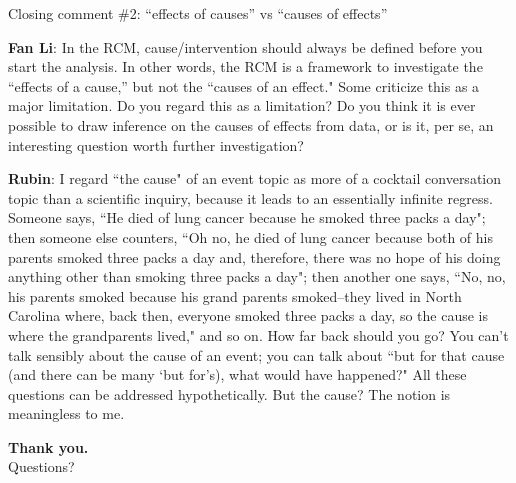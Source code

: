 \documentclass[aspectratio=169, 11pt, handout]{beamer}
\begin{document}
\begin{frame}{Closing comment \#2: ``effects of causes'' vs ``causes of effects''}

{\small

\textbf{Fan Li}: In the RCM, cause/intervention should always be defined before you start the
analysis. In other words, the RCM is a framework to investigate the “effects of a
cause,” but not the “causes of an effect." Some criticize this as a major limitation.
Do you regard this as a limitation? Do you think it is ever possible to draw inference
on the causes of effects from data, or is it, per se, an interesting question worth
further investigation?

\medskip

\textbf{Rubin}: I regard “the cause" of an event topic as more of a cocktail conversation topic than a scientific inquiry, because it leads to an essentially infinite regress. Someone says, “He died of lung cancer because he smoked three packs a day"; then someone else counters, “Oh no, he died of lung cancer because both of his parents smoked three packs a day and, therefore, there was no hope of his doing anything other than smoking three packs a day"; then another one says, “No, no, his parents smoked because his grand parents smoked--they lived in North Carolina where, back then, everyone smoked three packs a day, so the cause is where the grandparents lived," and so on. How far back should you go? You can’t talk sensibly about the cause of an event; you can talk about “but for that cause (and there can be many ‘but for’s), what would have happened?" All these questions can be addressed hypothetically. But the cause? The notion is meaningless to me.
}
\end{frame}
 
\begin{frame}
    \centering
    \vfill
    {\LARGE \textbf{Thank you.}}\\[1.2em]
    {\large Questions?}
    \vfill
\end{frame}
\end{document}
